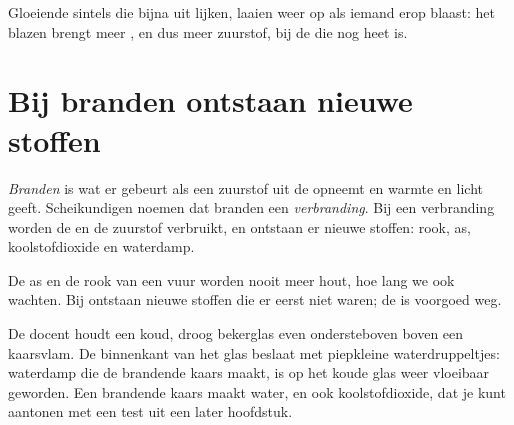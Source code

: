 \begin{example}\label{ex:g4:what-a-fire-needs:embers}
Gloeiende sintels die bijna uit lijken, laaien weer op als iemand erop
blaast: het blazen brengt meer , en dus meer zuurstof, bij de
 die nog heet is.
\end{example}

\section{Bij branden ontstaan nieuwe stoffen}

\begin{definition}\label{def:g4:what-a-fire-needs:burning}
\emph{Branden} is wat er gebeurt als een 
zuurstof uit de  opneemt en warmte en licht geeft. Scheikundigen
noemen dat branden een \emph{verbranding}. Bij een
verbranding worden de  en de zuurstof verbruikt, en ontstaan er
nieuwe stoffen: rook, as, koolstofdioxide en waterdamp.
\end{definition}

\begin{proposition}\label{prop:g4:what-a-fire-needs:new}
De as en de rook van een vuur worden nooit meer hout, hoe lang we ook
wachten. Bij  ontstaan nieuwe stoffen die er eerst niet waren; de
 is voorgoed weg.
\end{proposition}

\begin{inthelab}
De docent houdt een koud, droog bekerglas even ondersteboven boven een
kaarsvlam. De binnenkant van het glas beslaat met piepkleine
waterdruppeltjes: waterdamp die de brandende kaars maakt, is op het koude
glas weer vloeibaar geworden. Een brandende kaars maakt water, en ook
koolstofdioxide, dat je kunt aantonen met een test uit een later
hoofdstuk.
\end{inthelab}

